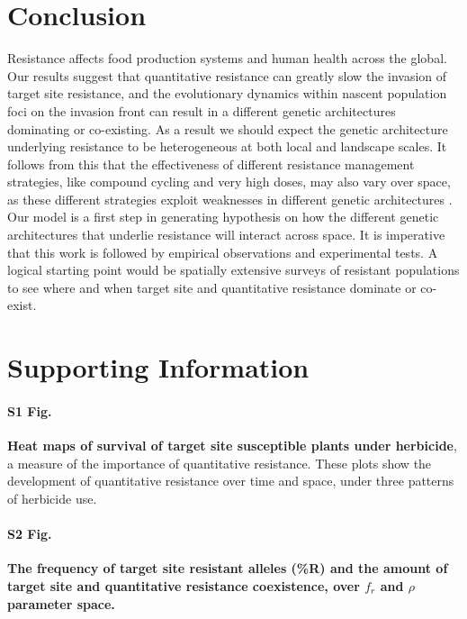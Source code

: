 \documentclass[10pt,letterpaper]{article}
\begin{document}
\section*{Conclusion}
Resistance affects food production systems and human health across the global. Our results suggest that quantitative resistance can greatly slow the invasion of target site resistance, and the evolutionary dynamics within nascent population foci on the invasion front can result in a different genetic architectures dominating or co-existing. As a result we should expect the genetic architecture underlying resistance to be heterogeneous at both local and landscape scales. It follows from this that the effectiveness of different resistance management strategies, like compound cycling and very high doses, may also vary over space, as these different strategies exploit weaknesses in different genetic architectures \cite{Gard1998, Rex2013}. Our model is a first step in generating hypothesis on how the different genetic architectures that underlie resistance will interact across space. It is imperative that this work is followed by empirical observations and experimental tests. A logical starting point would be spatially extensive surveys of resistant populations to see where and when target site and quantitative resistance dominate or co-exist.

\section*{Supporting Information}

\paragraph*{S1 Fig.}
\label{S1_Fig}
{\bf Heat maps of survival of target site susceptible plants under herbicide}, a measure of the importance of quantitative resistance. These plots show the development of quantitative resistance over time and space, under three patterns of herbicide use.

\paragraph*{S2 Fig.}
\label{S2_Fig}
{\bf The frequency of target site resistant alleles (\%R) and the amount of target site and quantitative resistance coexistence, over $f_r$ and $\rho$ parameter space.} 
\end{document}
